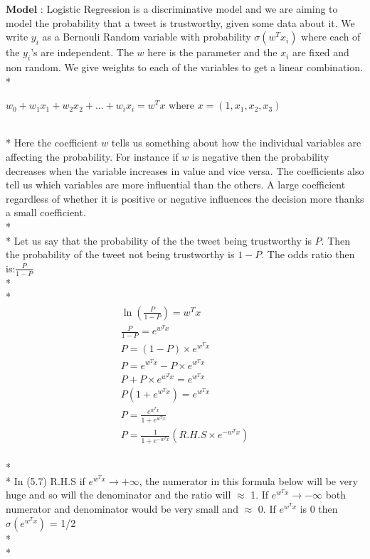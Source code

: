 $\mathbf{Model}$ :  Logistic Regression is a discriminative model and we are aiming to model the probability that a tweet is trustworthy, given some data about it. We write $y_i$ as a Bernouli Random variable with probability $\sigma(w^Tx_i)$ where each of the $y_i$'s are independent. The $w$ here is the parameter and the $x_i$ are fixed and non random. We give weights to each of the variables to get a linear combination. \\*
\centerline{$w_0 + w_1x_1 + w_2x_2 + ... + w_ix_i = w^Tx$ where $x = (1,x_1,x_2,x_3)$} \\*
Here the coefficient $w$ tells us something about how the individual variables are affecting the probability. For instance if $w$ is negative then the probability decreases when the variable increases in value and vice versa. The coefficients also tell us which variables are more influential than the others. A large coefficient regardless of whether it is positive or negative influences the decision more thanks a small coefficient. \\*\\*
\noindent
Let us say that the probability of the the tweet being trustworthy is $P$. Then the probability of the tweet not being trustworthy is $1-P$. The odds ratio then is:$\frac{P}{1 - P}$ \cite{41}\\*\\*
\begin{gather}
\ln (\frac{P}{1 - P}) = w^Tx\\
\frac{P}{1 - P}  = e^{w^Tx} \\
P = (1 - P)\times e^{w^Tx} \\
P = e^{w^Tx} - P\times e^{w^Tx} \\
P + P\times e^{w^Tx} = e^{w^Tx} \\
P(1 + e^{w^Tx}) = e^{w^Tx} \\
P = \frac{e^{w^Tx}}{1 + e^{w^Tx}} \\
P = \frac{1 }{1 + e^{-w^Tx}} (R.H.S \times e^{-w^Tx})
\end{gather}\\*\\*
\noindent
In (5.7) R.H.S if $e^{w^Tx} \to+\infty$, the numerator in this formula below will be very huge and so will the denominator and the ratio will $\approx$ 1. If $e^{w^Tx} \to-\infty$ both numerator and denominator would be very small and $\approx$ 0. If $e^{w^Tx}$ is 0 then $\sigma(e^{w^Tx})$ = 1/2 \\* \\*
